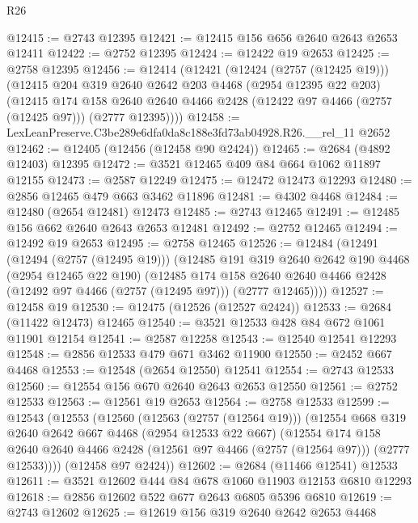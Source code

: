 \begin{lexlean}{R26}
\begin{coremodule}
@12415 := @2743 @12395
@12421 := @12415 @156 @656 @2640 @2643 @2653 @12411
@12422 := @2752 @12395
@12424 := @12422 @19 @2653
@12425 := @2758 @12395
@12456 := @12414
    (@12421
      (@12424 (@2757 (@12425 @19)))
      (@12415
        @204
        @319
        @2640
        @2642
        @203
        @4468
        (@2954 @12395 @22 @203)
        (@12415
          @174
          @158
          @2640
          @2640
          @4466
          @2428
          (@12422 @97 @4466 (@2757 (@12425 @97)))
          (@2777 @12395))))
@12458 := LexLeanPreserve.C3be289e6dfa0da8c188e3fd73ab04928.R26.__rel_11 @2652
@12462 := @12405 (@12456 (@12458 @90 @2424))
@12465 := @2684 (@4892 @12403) @12395
@12472 := @3521 @12465 @409 @84 @664 @1062 @11897 @12155
@12473 := @2587 @12249
@12475 := @12472 @12473 @12293
@12480 := @2856 @12465 @479 @663 @3462 @11896
@12481 := @4302 @4468
@12484 := @12480 (@2654 @12481) @12473
@12485 := @2743 @12465
@12491 := @12485 @156 @662 @2640 @2643 @2653 @12481
@12492 := @2752 @12465
@12494 := @12492 @19 @2653
@12495 := @2758 @12465
@12526 := @12484
    (@12491
      (@12494 (@2757 (@12495 @19)))
      (@12485
        @191
        @319
        @2640
        @2642
        @190
        @4468
        (@2954 @12465 @22 @190)
        (@12485
          @174
          @158
          @2640
          @2640
          @4466
          @2428
          (@12492 @97 @4466 (@2757 (@12495 @97)))
          (@2777 @12465))))
@12527 := @12458 @19
@12530 := @12475 (@12526 (@12527 @2424))
@12533 := @2684 (@11422 @12473) @12465
@12540 := @3521 @12533 @428 @84 @672 @1061 @11901 @12154
@12541 := @2587 @12258
@12543 := @12540 @12541 @12293
@12548 := @2856 @12533 @479 @671 @3462 @11900
@12550 := @2452 @667 @4468
@12553 := @12548 (@2654 @12550) @12541
@12554 := @2743 @12533
@12560 := @12554 @156 @670 @2640 @2643 @2653 @12550
@12561 := @2752 @12533
@12563 := @12561 @19 @2653
@12564 := @2758 @12533
@12599 := @12543
    (@12553
      (@12560
        (@12563 (@2757 (@12564 @19)))
        (@12554
          @668
          @319
          @2640
          @2642
          @667
          @4468
          (@2954 @12533 @22 @667)
          (@12554
            @174
            @158
            @2640
            @2640
            @4466
            @2428
            (@12561 @97 @4466 (@2757 (@12564 @97)))
            (@2777 @12533))))
      (@12458 @97 @2424))
@12602 := @2684 (@11466 @12541) @12533
@12611 := @3521 @12602 @444 @84 @678 @1060 @11903 @12153 @6810 @12293
@12618 := @2856 @12602 @522 @677 @2643 @6805 @5396 @6810
@12619 := @2743 @12602
@12625 := @12619 @156 @319 @2640 @2642 @2653 @4468

\end{coremodule}
\end{lexlean}
